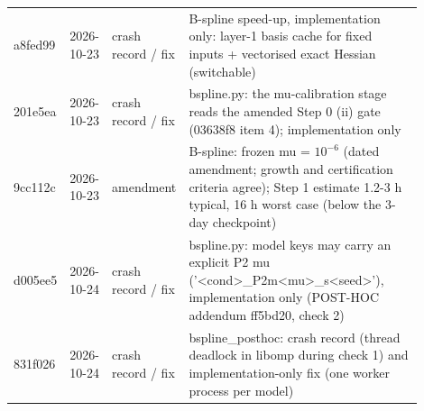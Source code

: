 {\begin{longtable}{R{0.08\linewidth} R{0.10\linewidth} R{0.14\linewidth} R{0.58\linewidth}}
a8fed99 & 2026-10-23 & crash record / fix & B-spline speed-up, implementation only: layer-1 basis cache for fixed inputs + vectorised exact Hessian (switchable) \\
201e5ea & 2026-10-23 & crash record / fix & bspline.py: the mu-calibration stage reads the amended Step 0 (ii) gate (03638f8 item 4); implementation only \\
9cc112c & 2026-10-23 & amendment & B-spline: frozen mu = $10^{-6}$ (dated amendment; growth and certification criteria agree); Step 1 estimate 1.2-3 h typical, 16 h worst case (below the 3-day checkpoint) \\
d005ee5 & 2026-10-24 & crash record / fix & bspline.py: model keys may carry an explicit P2 mu ('<cond>\_P2m<mu>\_s<seed>'), implementation only (POST-HOC addendum ff5bd20, check 2) \\
831f026 & 2026-10-24 & crash record / fix & bspline\_posthoc: crash record (thread deadlock in libomp during check 1) and implementation-only fix (one worker process per model) \\
\bottomrule
\end{longtable}}
